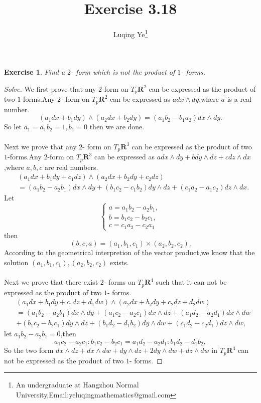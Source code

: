 \documentclass{article}
\newtheorem*{exe}{Exercise}
\newenvironment{exercise}
{\bigskip\begin{mdframed}\begin{exe}}
    {\end{exe}\end{mdframed}\bigskip}
\begin{document}
\title{Exercise 3.18}\author{Luqing Ye\footnote{An undergraduate at Hangzhou Normal University,Email:yeluqingmathematics@gmail.com}}
\maketitle\noindent
\begin{exercise}
  Find a $2$- form which is not the product of $1$- forms.
\end{exercise}
\begin{proof}[Solve]
We first prove that any $2$-form on $T_p\mathbf{R}^2$ can be expressed
as the product of two $1$-forms.Any $2$- form on $T_p\mathbf{R}^2$ can
be expressed as $a dx\wedge dy$,where $a$ is a real number.
$$
(a_{1}dx+b_{1}dy)\wedge (a_2dx+b_2dy)=(a_1b_2-b_{1}a_{2})dx\wedge dy.
$$
So let $a_1=a,b_2=1,b_1=0$ then we are done.\\\\

Next we prove that any $2$- form on $T_p\mathbf{R}^3$ can be expressed
as the product of two $1$-forms.Any $2$-form on $T_p\mathbf{R}^3$ can
be expressed as $a dx\wedge dy+b dy\wedge dz+c dz\wedge dx$,where
$a,b,c$ are real numbers.
\begin{align*}
&(a_1dx+b_1dy+c_1dz)\wedge (a_2dx+b_2dy+c_2dz)\\&=(a_1b_2-a_2b_1)dx\wedge
dy+(b_1c_2-c_1b_2)dy\wedge dz+(c_1a_2-a_1c_2)dz\wedge dx.
\end{align*}
Let 
$$
\begin{cases}
  a=a_1b_2-a_2b_1,\\
b=b_1c_2-b_2c_1,\\
c=c_1a_2-c_2a_1
\end{cases}
$$
then 
$$
(b,c,a)=(a_1,b_1,c_1)\times (a_2,b_2,c_2).
$$
According to the geometrical interpretion of the vector product,we
know that the solution $(a_1,b_1,c_1),(a_2,b_2,c_2)$ exists.\\\\

Next we prove that there exist $2$- forms on $T_p\mathbf{R}^4$ such
that it can not be expressed as the product of two $1$- forms.
\begin{align*}
&(a_1dx+b_1dy+c_1dz+d_1dw)\wedge
(a_2dx+b_2dy+c_2dz+d_2dw)\\&=(a_1b_2-a_2b_1)dx\wedge
dy+(a_1c_2-a_2c_1)dx\wedge dz+(a_1d_2-a_2d_1)dx\wedge
dw\\&+(b_1c_2-b_2c_1)dy\wedge dz+(b_1d_2-d_1b_2)dy\wedge
dw+(c_1d_2-c_2d_1)dz\wedge dw,
\end{align*}
let $a_1b_2-a_2b_1=0$,then
$$a_1c_2-a_2c_1:b_1c_2-b_2c_1=a_1d_2-a_2d_1:b_1d_2-d_1b_2,$$So the two
form $dx\wedge dz+dx\wedge dw+dy\wedge dz+2dy\wedge dw+dz\wedge dw$ in
$T_p\mathbf{R}^4$ can not be expressed as the product of two $1$- forms.
\end{proof}
\end{document}
